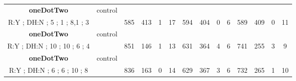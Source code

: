 \begin{table}[]
{\begin{tabular}{|c|c|c|c|c|c|c|c|c|c|c|c|c|c|}
\cellcolor{blue!15}\textbf{oneDotTwo} & control& {\color[HTML]{00009B} } & {\color[HTML]{9A0000} } & {\color[HTML]{009901} } &  & {\color[HTML]{00009B} } & {\color[HTML]{9A0000} } & {\color[HTML]{009901} } &  & {\color[HTML]{00009B} } & {\color[HTML]{9A0000} } & {\color[HTML]{009901} } &  \\ 
\cellcolor{ blue!15}R:Y ; DH:N ; 5 ; 1 ; 8,1 ; 3 &  & \multirow{-2}{*}{{\color[HTML]{00009B} 585}} & \multirow{-2}{*}{{\color[HTML]{9A0000} 413}} & \multirow{-2}{*}{{\color[HTML]{009901} 1}} & \multirow{-2}{*}{17} & \multirow{-2}{*}{{\color[HTML]{00009B} 594}} & \multirow{-2}{*}{{\color[HTML]{9A0000} 404}} & \multirow{-2}{*}{{\color[HTML]{009901} 0}} & \multirow{-2}{*}{6} & \multirow{-2}{*}{{\color[HTML]{00009B} 589}} & \multirow{-2}{*}{{\color[HTML]{9A0000} 409}} & \multirow{-2}{*}{{\color[HTML]{009901} 0}} & \multirow{-2}{*}{11} \\ \hline

\cellcolor{blue!15}\textbf{oneDotTwo} & control& {\color[HTML]{00009B} } & {\color[HTML]{9A0000} } & {\color[HTML]{009901} } &  & {\color[HTML]{00009B} } & {\color[HTML]{9A0000} } & {\color[HTML]{009901} } &  & {\color[HTML]{00009B} } & {\color[HTML]{9A0000} } & {\color[HTML]{009901} } &  \\ 
\cellcolor{ blue!15}R:Y ; DH:N ; 10 ; 10 ; 6 ; 4 &  & \multirow{-2}{*}{{\color[HTML]{00009B} 851}} & \multirow{-2}{*}{{\color[HTML]{9A0000} 146}} & \multirow{-2}{*}{{\color[HTML]{009901} 1}} & \multirow{-2}{*}{13} & \multirow{-2}{*}{{\color[HTML]{00009B} 631}} & \multirow{-2}{*}{{\color[HTML]{9A0000} 364}} & \multirow{-2}{*}{{\color[HTML]{009901} 4}} & \multirow{-2}{*}{6} & \multirow{-2}{*}{{\color[HTML]{00009B} 741}} & \multirow{-2}{*}{{\color[HTML]{9A0000} 255}} & \multirow{-2}{*}{{\color[HTML]{009901} 3}} & \multirow{-2}{*}{9} \\ \hline

\cellcolor{blue!15}\textbf{oneDotTwo} & control& {\color[HTML]{00009B} } & {\color[HTML]{9A0000} } & {\color[HTML]{009901} } &  & {\color[HTML]{00009B} } & {\color[HTML]{9A0000} } & {\color[HTML]{009901} } &  & {\color[HTML]{00009B} } & {\color[HTML]{9A0000} } & {\color[HTML]{009901} } &  \\ 
\cellcolor{ blue!15}R:Y ; DH:N ; 6 ; 6 ; 10 ; 8 &  & \multirow{-2}{*}{{\color[HTML]{00009B} 836}} & \multirow{-2}{*}{{\color[HTML]{9A0000} 163}} & \multirow{-2}{*}{{\color[HTML]{009901} 0}} & \multirow{-2}{*}{14} & \multirow{-2}{*}{{\color[HTML]{00009B} 629}} & \multirow{-2}{*}{{\color[HTML]{9A0000} 367}} & \multirow{-2}{*}{{\color[HTML]{009901} 3}} & \multirow{-2}{*}{6} & \multirow{-2}{*}{{\color[HTML]{00009B} 732}} & \multirow{-2}{*}{{\color[HTML]{9A0000} 265}} & \multirow{-2}{*}{{\color[HTML]{009901} 1}} & \multirow{-2}{*}{10} \\ \hline


\end{tabular}}
\end{table}
